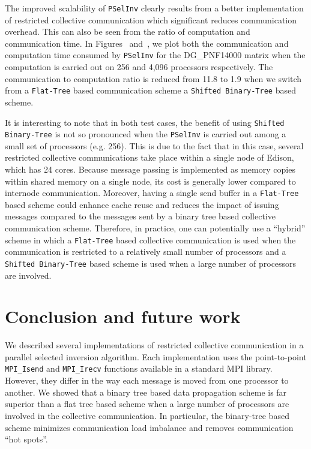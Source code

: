 \documentclass{acm_proc_article-sp}
\newcommand{\pselinv}{\texttt{PSelInv}\xspace}
\newcommand{\flattree}{\texttt{Flat-Tree}\xspace}
\newcommand{\modbtree}{\texttt{Shifted Binary-Tree}\xspace}
\begin{document}
The improved scalability of \pselinv clearly results from a better 
implementation of restricted collective communication which 
significant reduces communication overhead. This can also 
be seen from the ratio of computation and communication time. 
In Figures~ and~, we plot both the communication and computation time 
consumed by \pselinv for the DG\_PNF14000 matrix when the computation
is carried out on 256 and 4,096 processors respectively.
The communication to computation ratio is reduced from 11.8 to 1.9 
when we switch from a \flattree based communication scheme a 
\modbtree based scheme.




It is interesting to note that in both test cases, 
the benefit of using \modbtree is not so pronounced when
the \pselinv is carried out among a small set of processors
(e.g. 256). This is due to the fact that in this case,
several restricted collective communications take place 
within a single node of Edison, which has 24 cores.
Because message passing is implemented as memory copies within 
shared memory on a single node, its cost is generally lower
compared to internode communication. Moreover, having a single 
send buffer in a \flattree based scheme could enhance cache reuse
and reduces the impact of issuing  messages
compared to the  messages sent by a binary tree based
collective communication scheme.
Therefore, in practice, one can potentially use a ``hybrid'' 
scheme in which a \flattree based collective communication
is used when the communication is restricted to a relatively
small number of processors and a \modbtree based 
scheme is used when a large number of processors are involved.


\section{Conclusion and future work}\label{sec:conclusion}

We described several implementations of restricted collective 
communication in a parallel selected inversion algorithm.
Each implementation uses the point-to-point \texttt{MPI\_Isend} 
and \texttt{MPI\_Irecv} functions available in a standard MPI 
library. However, they differ in the way each message is 
moved from one processor to another. We showed that
a binary tree based data propagation scheme is far superior
than a flat tree based scheme when a large number of processors
are involved in the collective communication. In particular,
the binary-tree based scheme minimizes communication load 
imbalance and removes communication ``hot spots''. 
\end{document}
